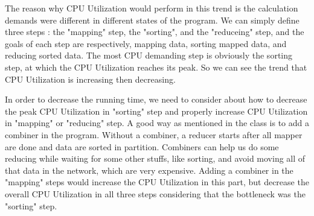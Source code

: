 \documentclass{article} %
\begin{document}
The reason why CPU Utilization would perform in this trend is the calculation
demands were different in different states of the program. We can simply define
three steps : the "mapping" step, the "sorting", and the "reduceing" step, and
the goals of each step are respectively, mapping data, sorting mapped data, and
reducing sorted data. The most CPU demanding step is obviously the sorting step,
at which the CPU Utilization reaches its peak. So we can see the trend that CPU
Utilization is increasing then decreasing.

In order to decrease the running time, we need to consider about how to decrease
the peak CPU Utilization in "sorting" step and properly increase CPU Utilization
in "mapping" or "reducing" step. A good way as mentioned in the class is to add
a combiner in the program. Without a combiner, a reducer starts after all mapper
are done and data are sorted in partition. Combiners can help us do some reducing
while waiting for some other stuffs, like sorting, and avoid moving all of that data
in the network, which are very expensive. Adding a combiner in the "mapping"
steps would increase the CPU Utilization in this part, but decrease the
overall CPU Utilization in all three steps considering that the bottleneck was
the "sorting" step.
\end{document}
